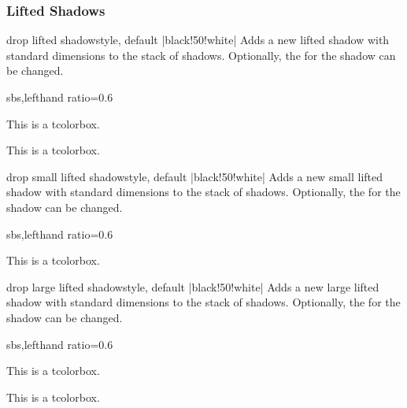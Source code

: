 \clearpage
\subsubsection{Lifted Shadows}

\begin{docTcbKey}{drop lifted shadow}{}{style, default |black!50!white|}
  Adds a new lifted shadow with standard dimensions to the stack of shadows.
  Optionally, the  for the shadow can be changed.
\begin{dispExample*}{sbs,lefthand ratio=0.6}

\begin{tcolorbox}
This is a tcolorbox.
\end{tcolorbox}\par\bigskip
\begin{tcolorbox}[title=Another shadow,
  drop lifted shadow=blue]
This is a tcolorbox.
\end{tcolorbox}
\end{dispExample*}
\end{docTcbKey}


\begin{docTcbKey}{drop small lifted shadow}{}{style, default |black!50!white|}
  Adds a new small lifted shadow with standard dimensions to the stack of shadows.
  Optionally, the  for the shadow can be changed.
\begin{dispExample*}{sbs,lefthand ratio=0.6}

\par\bigskip
\begin{tcolorbox}[title=Another shadow,
  drop small lifted shadow=black]
This is a tcolorbox.
\end{tcolorbox}
\end{dispExample*}
\end{docTcbKey}


\begin{docTcbKey}{drop large lifted shadow}{}{style, default |black!50!white|}
  Adds a new large lifted shadow with standard dimensions to the stack of shadows.
  Optionally, the  for the shadow can be changed.
\begin{dispExample*}{sbs,lefthand ratio=0.6}

\begin{tcolorbox}
This is a tcolorbox.
\end{tcolorbox}\par\bigskip
\begin{tcolorbox}[title=Another shadow,
  drop large lifted shadow=blue]
This is a tcolorbox.
\end{tcolorbox}
\end{dispExample*}
\end{docTcbKey}



